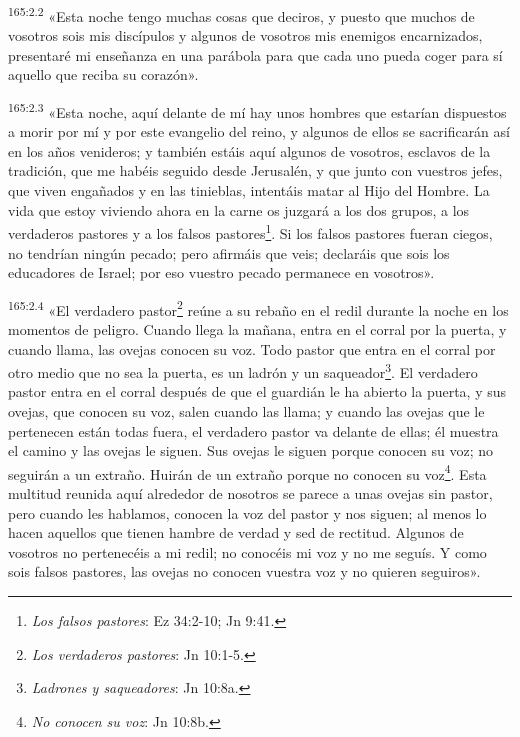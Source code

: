 \par 
\textsuperscript{165:2.2} «Esta noche tengo muchas cosas que deciros, y puesto que muchos de vosotros sois mis discípulos y algunos de vosotros mis enemigos encarnizados, presentaré mi enseñanza en una parábola para que cada uno pueda coger para sí aquello que reciba su corazón».

\par 
\textsuperscript{165:2.3} «Esta noche, aquí delante de mí hay unos hombres que estarían dispuestos a morir por mí y por este evangelio del reino, y algunos de ellos se sacrificarán así en los años venideros; y también estáis aquí algunos de vosotros, esclavos de la tradición, que me habéis seguido desde Jerusalén, y que junto con vuestros jefes, que viven engañados y en las tinieblas, intentáis matar al Hijo del Hombre. La vida que estoy viviendo ahora en la carne os juzgará a los dos grupos, a los verdaderos pastores y a los falsos pastores\footnote{\textit{Los falsos pastores}: Ez 34:2-10; Jn 9:41.}. Si los falsos pastores fueran ciegos, no tendrían ningún pecado; pero afirmáis que veis; declaráis que sois los educadores de Israel; por eso vuestro pecado permanece en vosotros».

\par 
\textsuperscript{165:2.4} «El verdadero pastor\footnote{\textit{Los verdaderos pastores}: Jn 10:1-5.} reúne a su rebaño en el redil durante la noche en los momentos de peligro. Cuando llega la mañana, entra en el corral por la puerta, y cuando llama, las ovejas conocen su voz. Todo pastor que entra en el corral por otro medio que no sea la puerta, es un ladrón y un saqueador\footnote{\textit{Ladrones y saqueadores}: Jn 10:8a.}. El verdadero pastor entra en el corral después de que el guardián le ha abierto la puerta, y sus ovejas, que conocen su voz, salen cuando las llama; y cuando las ovejas que le pertenecen están todas fuera, el verdadero pastor va delante de ellas; él muestra el camino y las ovejas le siguen. Sus ovejas le siguen porque conocen su voz; no seguirán a un extraño. Huirán de un extraño porque no conocen su voz\footnote{\textit{No conocen su voz}: Jn 10:8b.}. Esta multitud reunida aquí alrededor de nosotros se parece a unas ovejas sin pastor, pero cuando les hablamos, conocen la voz del pastor y nos siguen; al menos lo hacen aquellos que tienen hambre de verdad y sed de rectitud. Algunos de vosotros no pertenecéis a mi redil; no conocéis mi voz y no me seguís. Y como sois falsos pastores, las ovejas no conocen vuestra voz y no quieren seguiros».

